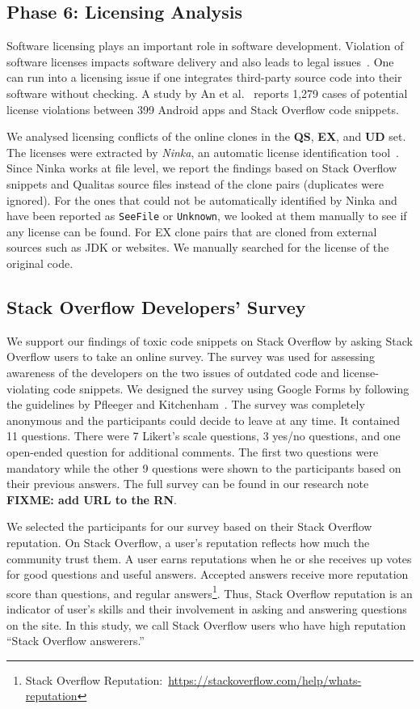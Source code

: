 \documentclass[10pt,journal,compsoc]{IEEEtran}
\newcommand\FIXME[1]{{\color{red}\textbf{FIXME: #1}}}
\begin{document}
\subsection{Phase 6: Licensing Analysis} Software licensing plays an important
role in software development. Violation of software licenses impacts software
delivery and also leads to legal issues~\cite{Sprigman2015}. 
One can run into a licensing issue if one integrates third-party source code
into their software without checking. A study by An et al.~\cite{An2017} reports
1,279 cases of potential license violations between 399 Android apps and Stack
Overflow code snippets.

We analysed licensing conflicts of the online clones in the \textbf{QS},
\textbf{EX}, and \textbf{UD} set. The licenses were extracted by \emph{Ninka},
an automatic license identification tool~\cite{German2010}. Since Ninka works at
file level, we report the findings based on Stack Overflow snippets and Qualitas
source files instead of the clone pairs (duplicates were ignored). For the ones
that could not be automatically identified by Ninka and have been reported as
{\small\texttt{SeeFile}} or {\small\texttt{Unknown}}, we looked at them manually
to see if any license can be found. For EX clone pairs that are cloned from
external sources such as JDK or websites. We manually searched for the license
of the original code.

\subsection{Stack Overflow Developers' Survey} We support our findings of
toxic code snippets on Stack Overflow by asking Stack
Overflow users to take an online survey. The survey was used for assessing awareness of
the developers on the two issues of outdated code and license-violating code
snippets. We designed the survey using Google Forms by following the guidelines by Pfleeger and
Kitchenham~\cite{Pfleeger2001,Kitchenham2002}. The survey was completely
anonymous and the participants could decide to leave at any time. It contained
11 questions. There were 7 Likert's scale questions, 3 yes/no questions, and one
open-ended question for additional comments. The first two questions were
mandatory while the other 9 questions were shown to the participants based on
their previous answers. The full survey can be found in our research note~
\FIXME{add URL to the RN}.

We selected the participants for our survey based on their Stack Overflow
reputation. On Stack Overflow, a user's reputation reflects how much the
community trust them. A user earns reputations when he or she receives up votes
for good questions and useful answers. Accepted answers receive more reputation
score than questions, and regular answers\footnote{Stack Overflow
Reputation:~\url{https://stackoverflow.com/help/whats-reputation}}. Thus, Stack
Overflow reputation is an indicator of user's skills and their involvement in
asking and answering questions on the site. In this study, we call Stack
Overflow users who have high reputation ``Stack Overflow answerers.''
\end{document}
